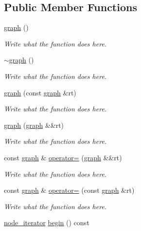 \subsection*{Public Member Functions}
\begin{DoxyCompactItemize}
\item 
\hyperlink{classgraph_af87b66e0c5abea18db06492c14adb5fb}{graph} ()
\begin{DoxyCompactList}\small\item\em Write what the function does here. \end{DoxyCompactList}\item 
\hyperlink{classgraph_a86a49b0dd6f2fbbdab4a044bb29e4a2a}{$\sim$graph} ()
\begin{DoxyCompactList}\small\item\em Write what the function does here. \end{DoxyCompactList}\item 
\hyperlink{classgraph_a0544402982f793695fb9cc071600b4b9}{graph} (const \hyperlink{classgraph}{graph} \&rt)
\begin{DoxyCompactList}\small\item\em Write what the function does here. \end{DoxyCompactList}\item 
\hyperlink{classgraph_a9353a5e27c35250f323b6f2bf7c14c40}{graph} (\hyperlink{classgraph}{graph} \&\&rt)
\begin{DoxyCompactList}\small\item\em Write what the function does here. \end{DoxyCompactList}\item 
const \hyperlink{classgraph}{graph} \& \hyperlink{classgraph_a08ffaf262ac16616c296d1b3c3c31559}{operator=} (\hyperlink{classgraph}{graph} \&\&rt)
\begin{DoxyCompactList}\small\item\em Write what the function does here. \end{DoxyCompactList}\item 
const \hyperlink{classgraph}{graph} \& \hyperlink{classgraph_aeb9dc4e35433477ab6c722eedaefd293}{operator=} (const \hyperlink{classgraph}{graph} \&rt)
\begin{DoxyCompactList}\small\item\em Write what the function does here. \end{DoxyCompactList}\item 
\hyperlink{classgraph_1_1node__iterator}{node\+\_\+iterator} \hyperlink{classgraph_a48e506355f6373565ba7578f23ee3d41}{begin} () const 

\end{DoxyCompactItemize}

